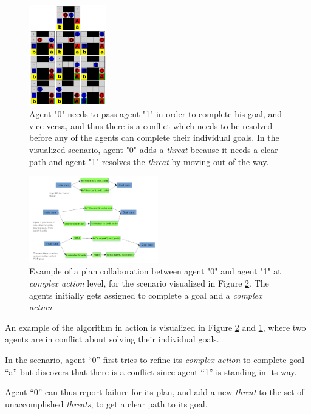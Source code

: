 \documentclass[Main]{subfiles}
\begin{document}
\begin{figure}[h!]
	\centering
	\includegraphics[width=0.3\textwidth]{plan_collab.png}
	\caption{Agent "0" needs to pass agent "1" in order to complete his goal, and vice versa, and thus there is a conflict which needs to be resolved before any of the agents can complete their individual goals. In the visualized scenario, agent "0" adds a \textit{threat} because it needs a clear path and agent "1" resolves the \textit{threat} by moving out of the way.}
	\label{fig:plan_collab}
\end{figure}

\begin{figure}[h!]
	\centering
	\includegraphics[width=0.5\textwidth]{unhtnpop.png}
	\caption{Example of a plan collaboration between agent "0" and agent "1" at \textit{complex action} level, for the scenario visualized in Figure \ref{fig:htn_collab}. The agents initially gets assigned to complete a goal and a \textit{complex action}.}
	\label{fig:htn_collab}
\end{figure}

An example of the algorithm in action is visualized in Figure
\ref{fig:htn_collab} and \ref{fig:plan_collab}, where two agents are in conflict
about solving their individual goals.


In the scenario, agent ``0'' first tries to refine its \textit{complex action} to
complete goal ``a'' but discovers that there is a conflict since agent ``1'' is
standing in its way.

Agent ``0'' can thus report failure for its plan, and add a new \textit{threat} to
the set of unaccomplished \textit{threats}, to get a clear path to its goal.
\end{document}
